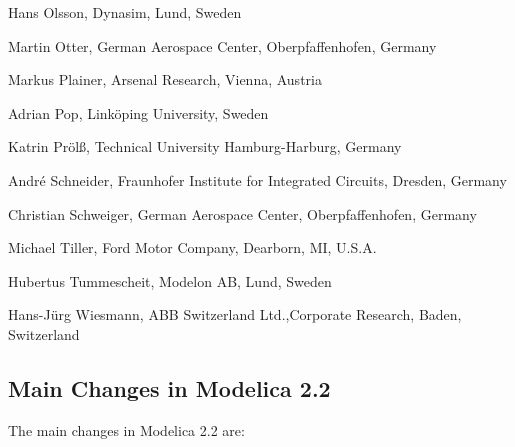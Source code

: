 \documentclass[10pt,a4paper]{report}
\def\doublelabel#1{\label{#1}}
\begin{document}
Hans Olsson, Dynasim, Lund, Sweden

Martin Otter, German Aerospace Center, Oberpfaffenhofen, Germany

Markus Plainer, Arsenal Research, Vienna, Austria

Adrian Pop, Linköping University, Sweden

Katrin Prölß, Technical University Hamburg-Harburg, Germany

André Schneider, Fraunhofer Institute for Integrated Circuits, Dresden,
Germany

Christian Schweiger, German Aerospace Center, Oberpfaffenhofen, Germany

Michael Tiller, Ford Motor Company, Dearborn, MI, U.S.A.

Hubertus Tummescheit, Modelon AB, Lund, Sweden

Hans-Jürg Wiesmann, ABB Switzerland Ltd.,Corporate Research, Baden,
Switzerland

\subsection{Main Changes in Modelica 2.2}\doublelabel{main-changes-in-modelica-2-2}

The main changes in Modelica 2.2 are:
\end{document}
